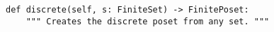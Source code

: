 \begin{verbatim}
def discrete(self, s: FiniteSet) -> FinitePoset:
    """ Creates the discrete poset from any set. """
\end{verbatim}